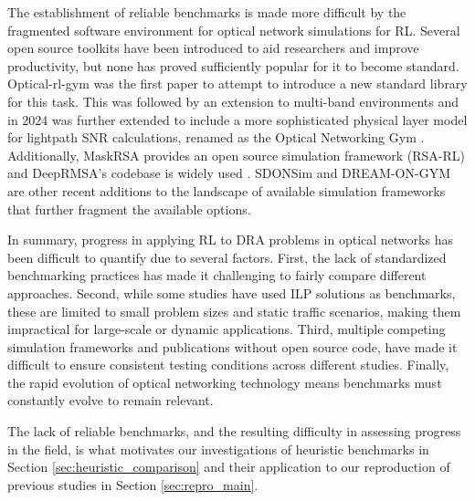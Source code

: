 The establishment of reliable benchmarks is made more difficult by the fragmented software environment for optical network simulations for RL. Several open source toolkits have been introduced to aid researchers and improve productivity, but none has proved sufficiently popular for it to become standard. Optical-rl-gym \cite{natalino_optical_2020} was the first paper to attempt to introduce a new standard library for this task. This was followed by an extension to multi-band environments \cite{morales_multi-band_2021} and in 2024 was further extended to include a more sophisticated physical layer model for lightpath SNR calculations, renamed as the Optical Networking Gym \cite{natalino_optical_2024}. Additionally, MaskRSA provides an open source simulation framework (RSA-RL) \cite{shimoda_mask_2021} and DeepRMSA's codebase is widely used \cite{chen_deeprmsa_nodate}. SDONSim \cite{mccann_sdonsim_2024} and DREAM-ON-GYM \cite{jara_dream-gym_2024} are other recent additions to the landscape of available simulation frameworks that further fragment the available options. 

In summary, progress in applying RL to DRA problems in optical networks has been difficult to quantify due to several factors. First, the lack of standardized benchmarking practices has made it challenging to fairly compare different approaches. Second, while some studies have used ILP solutions as benchmarks, these are limited to small problem sizes and static traffic scenarios, making them impractical for large-scale or dynamic applications. Third, multiple competing simulation frameworks %
and publications without open source code, have made it difficult to ensure consistent testing conditions across different studies. Finally, the rapid evolution of optical networking technology means benchmarks must constantly evolve to remain relevant. 

The lack of reliable benchmarks, and the resulting difficulty in assessing progress in the field, is what motivates our investigations of heuristic benchmarks in Section \ref{sec:heuristic_comparison} and their application to our reproduction of previous studies in Section \ref{sec:repro_main}.

% 




